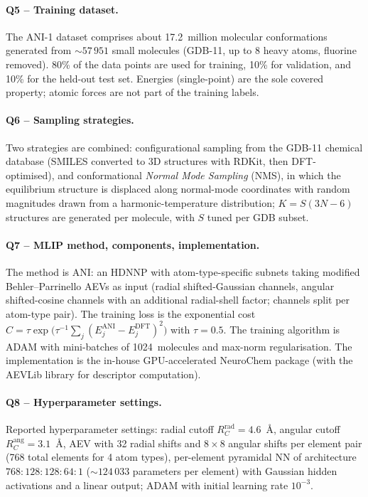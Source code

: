 \paragraph{Q5 -- Training dataset.}
The ANI-1 dataset comprises about 17.2~million molecular
conformations generated from $\sim 57\,951$ small molecules
(GDB-11, up to 8 heavy atoms, fluorine removed). 80\% of the
data points are used for training, 10\% for validation, and
10\% for the held-out test set. Energies (single-point) are the
sole covered property; atomic forces are not part of the
training labels.


\paragraph{Q6 -- Sampling strategies.}
Two strategies are combined: configurational sampling from the
GDB-11 chemical database (SMILES converted to 3D structures
with RDKit, then DFT-optimised), and conformational
\emph{Normal Mode Sampling} (NMS), in which the equilibrium
structure is displaced along normal-mode coordinates with
random magnitudes drawn from a harmonic-temperature
distribution; $K = S(3N-6)$ structures are generated per
molecule, with $S$ tuned per GDB subset.


\paragraph{Q7 -- MLIP method, components, implementation.}
The method is ANI: an HDNNP with atom-type-specific subnets
taking modified Behler--Parrinello AEVs as input (radial
shifted-Gaussian channels, angular shifted-cosine channels with
an additional radial-shell factor; channels split per atom-type
pair). The training loss is the exponential cost
$C = \tau \exp\bigl(\tau^{-1} \sum_j (E^{\mathrm{ANI}}_j -
E^{\mathrm{DFT}}_j)^2\bigr)$ with $\tau = 0.5$. The training
algorithm is ADAM with mini-batches of 1024~molecules and
max-norm regularisation. The implementation is the in-house
GPU-accelerated NeuroChem package (with the AEVLib library for
descriptor computation).


\paragraph{Q8 -- Hyperparameter settings.}
Reported hyperparameter settings: radial cutoff
$R_C^{\mathrm{rad}} = 4.6$~\AA{}, angular cutoff
$R_C^{\mathrm{ang}} = 3.1$~\AA, AEV with 32 radial shifts and
$8\times 8$ angular shifts per element pair (768 total elements
for 4 atom types), per-element pyramidal NN of architecture
$768{:}128{:}128{:}64{:}1$ ($\sim 124\,033$ parameters per
element) with Gaussian hidden activations and a linear output;
ADAM with initial learning rate $10^{-3}$.


